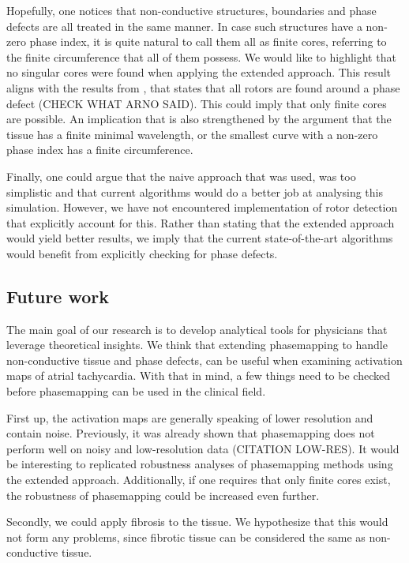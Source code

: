 \documentclass[twocolumn]{article}
\begin{document}
Hopefully, one notices that non-conductive structures, boundaries and
phase defects are all treated in the same manner.
In case such structures have a non-zero phase index,
it is quite natural to call them all as finite cores,
referring to the finite circumference that all of them possess.
We would like to highlight that no singular cores were found when
applying the extended approach.
This result aligns with the results from \autocite{tomii2021spatial, arno2021a},
that states that all rotors are found around a phase defect (CHECK
WHAT ARNO SAID).
This could imply that only finite cores are possible.
An implication that is also strengthened by the argument that the
tissue has a finite minimal wavelength,
or the smallest curve with a non-zero phase index has a finite circumference.

Finally, one could argue that the naive approach that was used,
was too simplistic and that current algorithms would do a better job at
analysing this simulation.
However, we have not encountered implementation of rotor detection
that explicitly account for this.
Rather than stating that the extended approach would yield better results,
we imply that the current state-of-the-art algorithms would benefit
from explicitly checking for phase defects.

\subsection{Future work}\label{future-work}

The main goal of our research is to develop analytical tools for physicians
that leverage theoretical insights.
We think that extending phasemapping to handle non-conductive tissue
and phase defects,
can be useful when examining activation maps of atrial tachycardia.
With that in mind, a few things need to be checked before
phasemapping can be used in the clinical field.

First up, the activation maps are generally speaking of lower resolution
and contain noise.
Previously, it was already shown that phasemapping does not perform well on
noisy and low-resolution data \autocite{lootens2024directed} (CITATION LOW-RES).
It would be interesting to replicated robustness analyses of
phasemapping methods using the extended approach.
Additionally, if one requires that only finite cores exist,
the robustness of phasemapping could be increased even further.

Secondly, we could apply fibrosis to the tissue.
We hypothesize that this would not form any problems,
since fibrotic tissue can be considered the same as non-conductive tissue.
\end{document}
